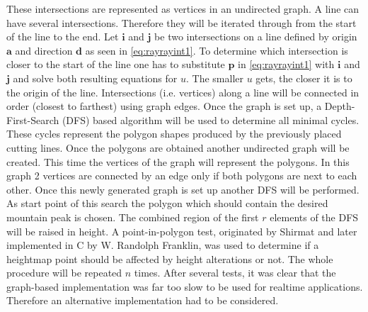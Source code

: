 \documentclass[11pt,a4paper,twoside,openright]{report}
\begin{document}
These intersections are represented as vertices in an undirected graph. A line can have several intersections. Therefore they will be iterated through from the start of the line to the end. Let $\mathbf{i}$ and $\mathbf{j}$ be two intersections on a line defined by origin $\mathbf{a}$ and direction $\mathbf{d}$ as seen in \cref{eq:rayrayint1}. To determine which intersection is closer to the start of the line one has to substitute $\mathbf{p}$ in \cref{eq:rayrayint1} with $\mathbf{i}$ and $\mathbf{j}$ and solve both resulting equations for $u$. The smaller $u$ gets, the closer it is to the origin of the line. Intersections (i.e. vertices) along a line will be connected in order (closest to farthest) using graph edges. Once the graph is set up, a Depth-First-Search (DFS) based algorithm will be used to determine all minimal cycles. These cycles represent the polygon shapes produced by the previously placed cutting lines. Once the polygons are obtained another undirected graph will be created. This time the vertices of the graph will represent the polygons. In this graph 2 vertices are connected by an edge only if both polygons are next to each other. Once this newly generated graph is set up another DFS will be performed. As start point of this search the polygon which should contain the desired mountain peak is chosen. The combined region of the first $r$ elements of the DFS will be raised in height. A point-in-polygon test, originated by Shirmat \cite{Shimrat:1962:APP:368637.368653} and later implemented in C by W. Randolph Franklin, was used to determine if a heightmap point should be affected by height alterations or not. The whole procedure will be repeated $n$ times. After several tests, it was clear that the graph-based implementation was far too slow to be used for realtime applications. Therefore an alternative implementation had to be considered.
\end{document}
